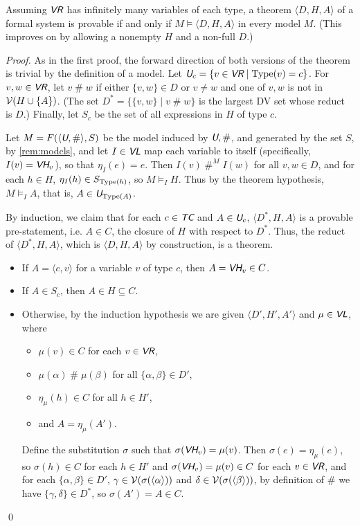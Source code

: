 \documentclass[runningheads,a4paper]{llncs}
\newcommand{\vr}{\textit{\textsf{VR}}} %
\newcommand{\vh}{\textit{\textsf{VH}}} %
\newcommand{\tc}{\textit{\textsf{TC}}} %
\newcommand{\vl}{\textit{\textsf{VL}}} %
\newcommand{\uv}{\textit{\textsf{U}}} %
\newcommand{\ang}[1]{\langle#1\rangle}
\newcommand{\type}{{\rm Type}}
\newcommand{\fresh}{\mathbin{\#}}
\begin{document}
\begin{theorem}\label{thm:godmod2}
Assuming $\vr$ has infinitely many variables of each type, a theorem $\ang{D,H,A}$ of a formal system is provable if and only if $M\models\ang{D,H,A}$ in every model $M$. (This improves on \cite{models} by allowing a nonempty $H$ and a non-full $D$.)
\end{theorem}
\begin{proof}
As in the first proof, the forward direction of both versions of the theorem is trivial by the definition of a model. Let $\uv_c=\{v\in\vr\mid\type(v)=c\}$. For $v,w\in\vr$, let $v\fresh w$ if either $\{v,w\}\in D$ or $v\ne w$ and one of $v,w$ is not in ${\cal V}(H\cup\{A\})$. (The set $D^\ast=\{\{v,w\}\mid v\fresh w\}$ is the largest DV set whose reduct is $D$.) Finally, let $S_c$ be the set of all expressions in $H$ of type $c$.

Let $M=F(\ang{\uv,\fresh}, S)$ be the model induced by $\uv,\fresh$, and generated by the set $S$, by \autoref{rem:modcls}, and let $I\in\vl$ map each variable to itself (specifically, $I(v)=\vh_v$), so that $\eta_I(e)=e$. Then $I(v)\fresh^M I(w)$ for all ${v,w}\in D$, and for each $h\in H$, $\eta_I(h)\in S_{\type(h)}$, so $M\models_I H$. Thus by the theorem hypothesis, $M\models_I A$, that is, $A\in\uv_{\type(A)}$.

By induction, we claim that for each $c\in\tc$ and $A\in\uv_c$, $\ang{D^\ast,H,A}$ is a provable pre-statement, i.e. $A\in C$, the closure of $H$ with respect to $D^\ast$. Thus, the reduct of $\ang{D^\ast,H,A}$, which is $\ang{D,H,A}$ by construction, is a theorem.

\begin{itemize}
  \item If $A=\ang{c,v}$ for a variable $v$ of type $c$, then $A=\vh_v\in C$.
  \item If $A\in S_c$, then $A\in H\subseteq C$.
  \item Otherwise, by the induction hypothesis we are given $\ang{D',H',A'}$ and $\mu\in\vl$, where
  \begin{itemize}
    \item $\mu(v)\in C$ for each $v\in\vr$,
    \item $\mu(\alpha)\fresh\mu(\beta)$ for all $\{\alpha,\beta\}\in D'$,
    \item $\eta_\mu(h)\in C$ for all $h\in H'$,
    \item and $A=\eta_\mu(A')$.
  \end{itemize}
  Define the substitution $\sigma$ such that $\sigma(\vh_v)=\mu(v)$. Then $\sigma(e)=\eta_\mu(e)$, so $\sigma(h)\in C$ for each $h\in H'$ and $\sigma(\vh_v)=\mu(v)\in C$ for each $v\in\vr$, and for each $\{\alpha,\beta\}\in D'$, $\gamma\in{\cal V}(\sigma(\ang{\alpha}))$ and $\delta\in{\cal V}(\sigma(\ang{\beta}))$, by definition of $\fresh$ we have $\{\gamma,\delta\}\in D^\ast$, so $\sigma(A')=A\in C$.
\end{itemize}
\qed\end{proof}
\end{document}
